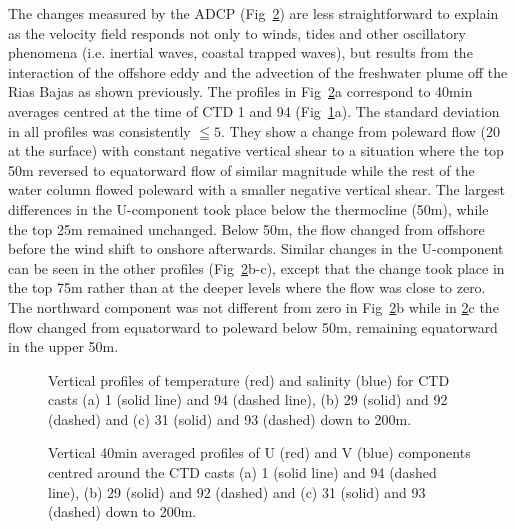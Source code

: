 The changes measured by the ADCP (Fig~\ref{fig:refadcp}) are less
straightforward to explain as the velocity field responds not only
to winds, tides and other oscillatory phenomena (i.e. inertial
waves, coastal trapped waves), but results from the interaction of
the offshore eddy and the advection of the freshwater plume off
the Rias Bajas as shown previously. The profiles in
Fig~\ref{fig:refadcp}a correspond to 40min averages centred at the
time of CTD 1 and 94 (Fig~\ref{fig:refctd}a). The standard
deviation in all profiles was consistently $\leqq 5$\velc. They
show a change from poleward flow (20\velc\, at the surface) with
constant negative vertical shear to a situation where the top 50m
reversed to equatorward flow of similar magnitude while the rest
of the water column flowed poleward with a smaller negative
vertical shear. The largest differences in the U-component took
place below the thermocline (50m), while the top 25m remained
unchanged. Below 50m, the flow changed from offshore before the
wind shift to onshore afterwards. Similar changes in the
U-component can be seen in the other profiles
(Fig~\ref{fig:refadcp}b-c), except that the change took place in
the top 75m rather than at the deeper levels where the flow was
close to zero. The northward component was not different from zero
in Fig~\ref{fig:refadcp}b while in \ref{fig:refadcp}c the flow
changed from equatorward to poleward below 50m, remaining
equatorward in the upper 50m.

\begin{figure}[!p]
\centering {}%
\caption{Vertical profiles of temperature (red) and salinity
(blue) for CTD casts (a) 1 (solid line) and 94 (dashed line), (b)
29 (solid) and 92 (dashed) and (c) 31 (solid) and 93 (dashed) down
to 200m.} \label{fig:refctd}\end{figure}
\begin{figure}[!p]
\centering {}%
\caption{Vertical 40min averaged profiles of U (red) and V (blue)
components centred around the CTD casts (a) 1 (solid line) and 94
(dashed line), (b) 29 (solid) and 92 (dashed) and (c) 31 (solid)
and 93 (dashed) down to 200m.} \label{fig:refadcp}\end{figure}

